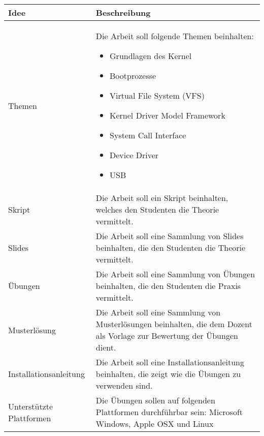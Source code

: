 \begin{table}[h!]
\begin{center}
   \scriptsize
   \begin{tabular}{| p{4cm} | p{11cm} |} \hline
      \textbf{Idee}        & \textbf{Beschreibung} \\ \hline
      Themen                      
      & Die Arbeit soll folgende Themen beinhalten: 
      \begin{itemize}[noitemsep,nolistsep]
         \item Grundlagen des Kernel
         \item Bootprozesse
         \item Virtual File System (VFS)
         \item Kernel Driver Model Framework
         \item System Call Interface
         \item Device Driver
         \item USB
      \end{itemize}
      \\ \hline

      Skript
      & Die Arbeit soll ein Skript beinhalten, welches den Studenten die Theorie vermittelt. \newline
      \\ \hline

      Slides
      & Die Arbeit soll eine Sammlung von Slides beinhalten, die den Studenten die Theorie vermittelt. \newline
      \\ \hline

      Übungen
      & Die Arbeit soll eine Sammlung von Übungen beinhalten, die den Studenten die Praxis vermittelt. \newline
      \\ \hline

      Musterlösung
      & Die Arbeit soll eine Sammlung von Musterlösungen beinhalten, die dem Dozent als Vorlage zur Bewertung der Übungen dient. \newline
      \\ \hline

      Installationsanleitung
      & Die Arbeit soll eine Installationsanleitung beinhalten, die zeigt wie die Übungen zu verwenden sind. \newline
      \\ \hline

      Unterstützte Plattformen
      & Die Übungen sollen auf folgenden Plattformen durchführbar sein: Microsoft Windows, Apple OSX und Linux \newline
      \\ \hline


\end{tabular}
\end{center}
\end{table}
